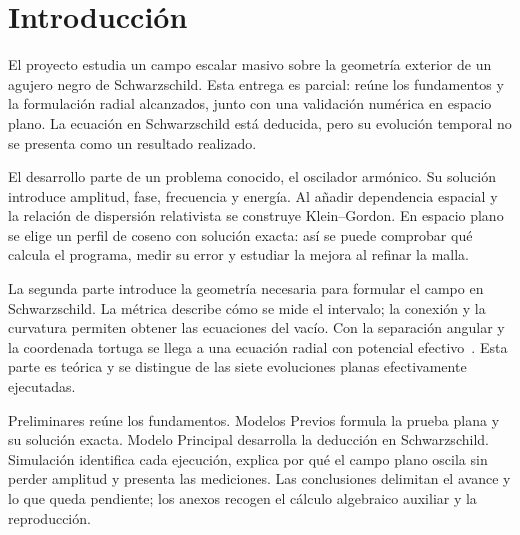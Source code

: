 \chapter*{Introducción}
\label{ch:introduccion}

El proyecto estudia un campo escalar masivo sobre la geometría exterior
de un agujero negro de Schwarzschild. Esta entrega es parcial: reúne
los fundamentos y la formulación radial alcanzados, junto con una
validación numérica en espacio plano. La ecuación en Schwarzschild
está deducida, pero su evolución temporal no se presenta como un
resultado realizado.

El desarrollo parte de un problema conocido, el oscilador armónico.
Su solución introduce amplitud, fase, frecuencia y energía. Al añadir
dependencia espacial y la relación de dispersión relativista se
construye Klein--Gordon. En espacio plano se elige un perfil de coseno
con solución exacta: así se puede comprobar qué calcula el programa,
medir su error y estudiar la mejora al refinar la malla.

La segunda parte introduce la geometría necesaria para formular el
campo en Schwarzschild. La métrica describe cómo se mide el intervalo;
la conexión y la curvatura permiten obtener las ecuaciones del vacío.
Con la separación angular y la coordenada tortuga se llega a una
ecuación radial con potencial efectivo~\cite{TongGR,Barranco2011}.
Esta parte es teórica y se distingue de las siete evoluciones planas
efectivamente ejecutadas.

Preliminares reúne los fundamentos. Modelos Previos formula la prueba
plana y su solución exacta. Modelo Principal desarrolla la deducción en
Schwarzschild. Simulación identifica cada ejecución, explica por qué
el campo plano oscila sin perder amplitud y presenta las mediciones.
Las conclusiones delimitan el avance y lo que queda pendiente; los
anexos recogen el cálculo algebraico auxiliar y la reproducción.
